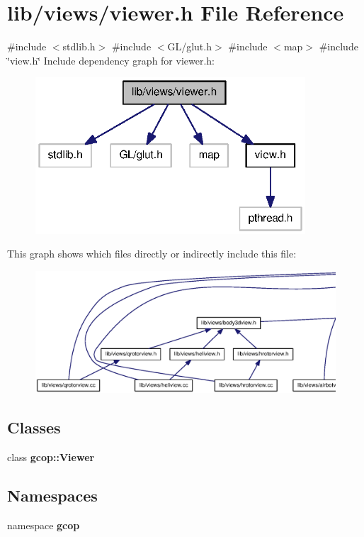\section{lib/views/viewer.h \-File \-Reference}
\label{viewer_8h}
{\ttfamily \#include $<$stdlib.\-h$>$}\*
{\ttfamily \#include $<$\-G\-L/glut.\-h$>$}\*
{\ttfamily \#include $<$map$>$}\*
{\ttfamily \#include \char`\"{}view.\-h\char`\"{}}\*
\-Include dependency graph for viewer.\-h\-:\nopagebreak
\begin{figure}[H]
\begin{center}
\leavevmode
\includegraphics[width=286pt]{viewer_8h__incl}
\end{center}
\end{figure}
\-This graph shows which files directly or indirectly include this file\-:\nopagebreak
\begin{figure}[H]
\begin{center}
\leavevmode
\includegraphics[width=350pt]{viewer_8h__dep__incl}
\end{center}
\end{figure}
\subsection*{\-Classes}
\begin{DoxyCompactItemize}
\item 
class {\bf gcop\-::\-Viewer}
\end{DoxyCompactItemize}
\subsection*{\-Namespaces}
\begin{DoxyCompactItemize}
\item 
namespace {\bf gcop}
\end{DoxyCompactItemize}
